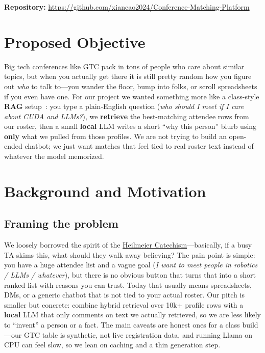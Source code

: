 \documentclass[paper=a4, fontsize=11pt]{scrartcl}
\author{%
  \textbf{Xian Cao, Xueming Tang, Chenyang Li} \\
  \href{https://github.com/xiancao2024/Conference-Matching-Platform}{GitHub repository} (contact e-mails on submission cover sheet as required)
}
\begin{document}
\maketitle

\noindent\textbf{Repository:} \url{https://github.com/xiancao2024/Conference-Matching-Platform}

\section{Proposed Objective}

Big tech conferences like GTC pack in tons of people who care about similar topics, but when you actually get there it is still pretty random how you figure out \emph{who} to talk to---you wander the floor, bump into folks, or scroll spreadsheets if you even have one. For our project we wanted something more like a class-style \textbf{RAG} setup~\cite{lewis2020retrieval}: you type a plain-English question (\emph{who should I meet if I care about CUDA and LLMs?}), we \textbf{retrieve} the best-matching attendee rows from our roster, then a small \textbf{local} LLM writes a short ``why this person'' blurb using \textbf{only} what we pulled from those profiles. We are not trying to build an open-ended chatbot; we just want matches that feel tied to real roster text instead of whatever the model memorized.

\section{Background and Motivation}

\subsection*{Framing the problem}

We loosely borrowed the spirit of the \href{https://www.darpa.mil/work-with-us/heilmeier-catechism}{Heilmeier Catechism}---basically, if a busy TA skims this, what should they walk away believing? The pain point is simple: you have a huge attendee list and a vague goal (\emph{I want to meet people in robotics / LLMs / whatever}), but there is no obvious button that turns that into a short ranked list with reasons you can trust. Today that usually means spreadsheets, DMs, or a generic chatbot that is not tied to your actual roster. Our pitch is smaller but concrete: combine hybrid retrieval over 10k+ profile rows with a \textbf{local} LLM that only comments on text we actually retrieved, so we are less likely to ``invent'' a person or a fact. The main caveats are honest ones for a class build---our GTC table is synthetic, not live registration data, and running Llama on CPU can feel slow, so we lean on caching and a thin generation step.
\end{document}
